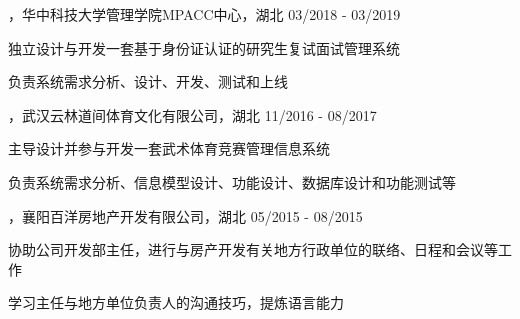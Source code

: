 
\begin{cventries}

\cvexperience
{，华中科技大学管理学院MPACC中心，湖北}
{03/2018 - 03/2019}
{
    \begin{cvitems}
    \item {独立设计与开发一套基于身份证认证的研究生复试面试管理系统}
    \item {负责系统需求分析、设计、开发、测试和上线}
    \end{cvitems}
}

\cvexperience
{，武汉云林道间体育文化有限公司，湖北}
{11/2016 - 08/2017}
{
    \begin{cvitems}
    \item {主导设计并参与开发一套武术体育竞赛管理信息系统}
    \item {负责系统需求分析、信息模型设计、功能设计、数据库设计和功能测试等}
    \end{cvitems}
}

\cvexperience
{，襄阳百洋房地产开发有限公司，湖北}
{05/2015 - 08/2015}
{
    \begin{cvitems}
    \item {协助公司开发部主任，进行与房产开发有关地方行政单位的联络、日程和会议等工作}
    \item {学习主任与地方单位负责人的沟通技巧，提炼语言能力}
    \end{cvitems}
}

\end{cventries}